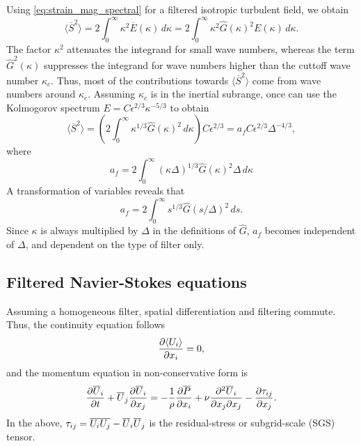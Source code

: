 \documentclass[oneside,a4paper,11pt]{report}
\begin{document}
Using \cref{eq:strain_mag_spectral} for a filtered isotropic turbulent field, we obtain
\begin{equation}
\langle \overline{S}^2 \rangle = 2 \int_0^\infty \kappa^2 \overline{E}(\kappa) \,d\kappa = 2 \int_0^\infty \kappa^2 \hat{G}(\kappa)^2 E(\kappa) \,d\kappa.
\end{equation}
The factor $\kappa^2$ attenuates the integrand for small wave numbers, whereas the term $\hat{G}^2(\kappa)$ suppresses the integrand for wave numbers higher than the cuttoff wave number $\kappa_c$. Thus, most of the contributions towards $\langle \overline{S}^2 \rangle$ come from wave numbers around $\kappa_c$. Assuming $\kappa_c$ is in the inertial subrange, once can use the Kolmogorov spectrum $E = C \epsilon^{2/3} \kappa^{-5/3}$ to obtain
\begin{equation}
\label{eq:S2_estimate}
\langle \overline{S}^2 \rangle = \left ( 2 \int_0^\infty \kappa^{1/3} \hat{G}(\kappa)^2 \,d\kappa \right ) C \epsilon^{2/3} = a_f C \epsilon^{2/3} \Delta^{-4/3},
\end{equation}
where 
\begin{equation}
a_f = 2 \int_0^\infty ( \kappa \Delta )^{1/3} \hat{G}(\kappa)^2 \Delta \, d\kappa 
\end{equation}
A transformation of variables reveals that
\begin{equation}
a_f = 2 \int_0^\infty s^{1/3} \hat{G} (s/\Delta )^2\, ds.
\end{equation}
Since $\kappa$ is always multiplied by $\Delta$ in the definitions of $\hat{G}$, $a_f$ becomes independent of $\Delta$, and dependent on the type of filter only.

\subsection{Filtered Navier-Stokes equations}

Assuming a homogeneous filter, spatial differentiation and filtering commute. Thus, the continuity equation follows
\begin{equation}
\frac{\partial \langle U_i \rangle}{\partial x_i} = 0,
\end{equation}
and the momentum equation in non-conservative form is
\begin{equation}
\frac{\partial \overline{U}_i}{\partial t} + \overline{U}_j \frac{\partial \overline{U}_i}{\partial x_j} = -\frac{1}{\rho} \frac{\partial \overline{P}}{\partial x_i} + \nu \frac{\partial^2 \overline{U}_i}{\partial x_j \partial x_j} - \frac{\partial \tau_{ij}}{\partial x_j}.
\end{equation}
In the above, $\tau_{ij} = \overline{ U_i U_j} - \overline{U}_i \overline{U}_j$ is the residual-stress or subgrid-scale (SGS) tensor.
\end{document}
